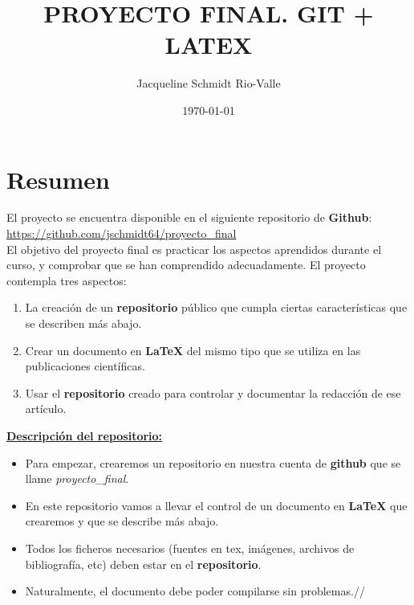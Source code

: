 \documentclass[a4paper,11pt]{article}
\title{\Huge{\textbf{PROYECTO FINAL. GIT + LATEX}}}
\author{\LARGE{Jacqueline Schmidt Rio-Valle}}
\date{\today}
\begin{document}
\maketitle	
	
\newpage	
	
\tableofcontents	

\newpage
	
\section{Resumen}

El proyecto se encuentra disponible en el siguiente repositorio de \textbf{Github}: \url{https://github.com/jschmidt64/proyecto_final}\\

El objetivo del proyecto final es practicar los aspectos aprendidos durante el curso, y comprobar que se han comprendido adecuadamente. El proyecto contempla tres aspectos:

\begin{enumerate}
	\item La creación de un \textbf{repositorio} público que cumpla ciertas características que se describen más abajo.
	\item Crear un documento en \textbf{LaTeX} del mismo tipo que se utiliza en las publicaciones científicas.
	\item Usar el \textbf{repositorio} creado para controlar y documentar la redacción de ese artículo.
\end{enumerate}

\textbf{\underline{Descripción del repositorio:}}\\

\begin{itemize}
	\item Para empezar, crearemos un repositorio en nuestra cuenta de \textbf{github} que se llame \textit{proyecto\_final}.
	
	\item En este repositorio vamos a llevar el control de un documento en \textbf{LaTeX} que crearemos y que se describe más abajo.
	
	\item Todos los ficheros necesarios (fuentes en tex, imágenes, archivos de bibliografía, etc) deben estar en el \textbf{repositorio}.
	
	\item Naturalmente, el documento debe poder compilarse sin problemas.//          
\end{itemize}
\end{document}
